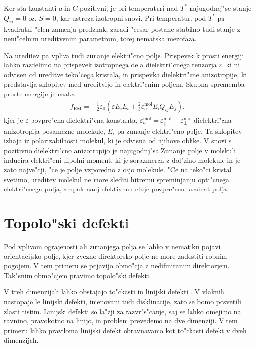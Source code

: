 \documentclass[12pt,twoside,openright,final]{report}
\begin{document}
Ker sta konstanti $a$ in $C$ pozitivni, je pri temperaturi nad $T^\ast$ najugodnej"se stanje $Q_{ij}=0$ oz. $S=0$, kar ustreza izotropni snovi. 
Pri temperaturi pod $T^\ast$ pa kvadratni "clen zamenja predznak, zaradi "cesar postane stabilno tudi stanje z neni"celnim ureditvenim parametrom, torej nematska mezofaza. 

Na ureditev pa vpliva tudi zunanje elektri"cno polje. 
Prispevek k prosti energiji lahko razdelimo na prispevek izotropnega dela dielektri"cnega tenzorja $\overline\varepsilon$, ki ni odvisen od ureditve teko"cega kristala, in prispevka dielektri"cne anizotropije, ki predstavlja sklopitev med ureditvijo in elektri"cnim poljem. 
Skupna sprememba proste energije je enaka
\begin{align}
\label{eq:dielektricna-sklopitev}
  f_{\mathrm{EM}} = -\frac{1}{2}\varepsilon_0 \left(\overline\varepsilon E_i E_i + \frac{2}{3}\varepsilon_a^{\mathrm{mol}} E_iQ_{ij}E_j \right),
\end{align}
kjer je $\overline{\varepsilon}$ povpre"cna dielektri"cna konstanta, $\varepsilon_a^{\mathrm{mol}} = \varepsilon_{\parallel}^{\mathrm{mol}} - \varepsilon_{\perp}^{\mathrm{mol}}$ dielektri"cna anizotropija posamezne molekule, $E_i$ pa zunanje elektri"cno polje. 
Ta sklopitev izhaja iz polarizabilnosti molekul, ki je odvisna od njihove oblike. 
V snovi s pozitivno dielektri"cno anizotropijo je najugodnj"sa 
Zunanje polje v molekuli inducira elektri"cni dipolni moment, ki je sorazmeren z dol"zino molekule in je zato najve"cji, "ce je polje vzporedno z osjo molekule. 
"Ce na teko"ci kristal svetimo, ureditev molekul ne more slediti hitremu spreminjanju opti"cnega elektri"cnega polja, ampak nanj efektivno deluje povpre"cen kvadrat polja. 

\section{Topolo"ski defekti}

Pod vplivom ograjenosti ali zunanjega polja se lahko v nematiku pojavi orientacijsko polje, kjer zvezno direktorsko polje ne more zadostiti robnim pogojem. 
V tem primeru se pojavijo obmo"cja z nedifiniranim direktorjem. 
Tak"snim obmo"cjem pravimo topolo"ski defekti. 

V treh dimenzijah lahko obstajajo to"ckasti in linijski defekti \cite{degennes,kleman}. 
V vlaknih nastopajo le linijski defekti, imenovani tudi disklinacije, zato se bomo posvetili zlasti tistim. 
Linijski defekti so la"zji za razvr"s"canje, saj se lahko omejimo na ravnino, pravokotno na linijo, in problem prevedemo na dve dimenziji. 
V tem primeru lahko praviloma linijski defekt obravnavamo kot to"ckasti defekt v dveh dimenzijah. 
\end{document}
